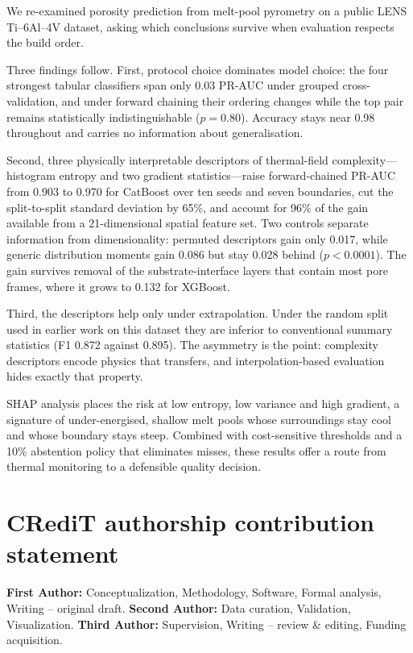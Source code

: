 \documentclass[preprint,12pt]{elsarticle}
\begin{document}
We re-examined porosity prediction from melt-pool pyrometry on a public LENS Ti--6Al--4V dataset, asking which conclusions survive when evaluation respects the build order.

Three findings follow. First, protocol choice dominates model choice: the four strongest tabular classifiers span only 0.03 PR-AUC under grouped cross-validation, and under forward chaining their ordering changes while the top pair remains statistically indistinguishable ($p=0.80$). Accuracy stays near 0.98 throughout and carries no information about generalisation.

Second, three physically interpretable descriptors of thermal-field complexity---histogram entropy and two gradient statistics---raise forward-chained PR-AUC from 0.903 to 0.970 for CatBoost over ten seeds and seven boundaries, cut the split-to-split standard deviation by 65\%, and account for 96\% of the gain available from a 21-dimensional spatial feature set. Two controls separate information from dimensionality: permuted descriptors gain only 0.017, while generic distribution moments gain 0.086 but stay 0.028 behind ($p<0.0001$). The gain survives removal of the substrate-interface layers that contain most pore frames, where it grows to 0.132 for XGBoost.

Third, the descriptors help only under extrapolation. Under the random split used in earlier work on this dataset they are inferior to conventional summary statistics (F1 0.872 against 0.895). The asymmetry is the point: complexity descriptors encode physics that transfers, and interpolation-based evaluation hides exactly that property.

SHAP analysis places the risk at low entropy, low variance and high gradient, a signature of under-energised, shallow melt pools whose surroundings stay cool and whose boundary stays steep. Combined with cost-sensitive thresholds and a 10\% abstention policy that eliminates misses, these results offer a route from thermal monitoring to a defensible quality decision.

\section*{CRediT authorship contribution statement}

\textbf{First Author:} Conceptualization, Methodology, Software, Formal analysis, Writing -- original draft. \textbf{Second Author:} Data curation, Validation, Visualization. \textbf{Third Author:} Supervision, Writing -- review \& editing, Funding acquisition.
\end{document}
